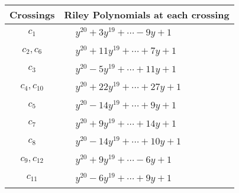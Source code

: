 \documentclass[1p]{elsarticle_modified}
\theoremstyle{definition}
\begin{document}
\begin{tabular}{m{50pt}|m{274pt}}
Crossings & \hspace{64pt}Riley Polynomials at each crossing \\
\hline $$\begin{aligned}c_{1}\end{aligned}$$&$\begin{aligned}
&y^{20}+3 y^{19}+\cdots-9 y+1
\end{aligned}$\\
\hline $$\begin{aligned}c_{2},c_{6}\end{aligned}$$&$\begin{aligned}
&y^{20}+11 y^{19}+\cdots+7 y+1
\end{aligned}$\\
\hline $$\begin{aligned}c_{3}\end{aligned}$$&$\begin{aligned}
&y^{20}-5 y^{19}+\cdots+11 y+1
\end{aligned}$\\
\hline $$\begin{aligned}c_{4},c_{10}\end{aligned}$$&$\begin{aligned}
&y^{20}+22 y^{19}+\cdots+27 y+1
\end{aligned}$\\
\hline $$\begin{aligned}c_{5}\end{aligned}$$&$\begin{aligned}
&y^{20}-14 y^{19}+\cdots+9 y+1
\end{aligned}$\\
\hline $$\begin{aligned}c_{7}\end{aligned}$$&$\begin{aligned}
&y^{20}+9 y^{19}+\cdots+14 y+1
\end{aligned}$\\
\hline $$\begin{aligned}c_{8}\end{aligned}$$&$\begin{aligned}
&y^{20}-14 y^{19}+\cdots+10 y+1
\end{aligned}$\\
\hline $$\begin{aligned}c_{9},c_{12}\end{aligned}$$&$\begin{aligned}
&y^{20}+9 y^{19}+\cdots-6 y+1
\end{aligned}$\\
\hline $$\begin{aligned}c_{11}\end{aligned}$$&$\begin{aligned}
&y^{20}-6 y^{19}+\cdots+9 y+1
\end{aligned}$\\
\hline
\end{tabular}\\~\\
\end{document}
